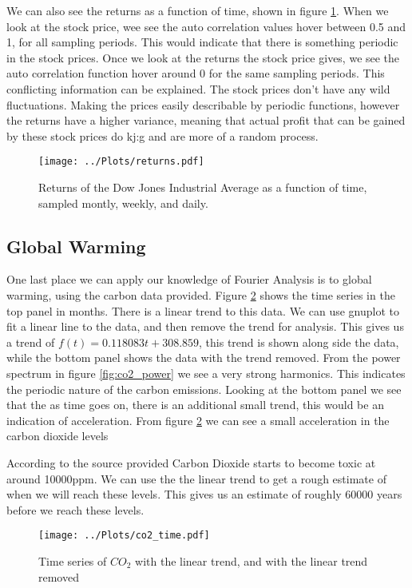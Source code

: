 \documentclass[twocolumn]{myarticle}
\begin{document}
We can also see the returns as a function of time, shown in figure \ref{fig:returns}. 
When we look at the stock price, wee see the auto correlation values hover between 0.5 and 1, for all sampling periods. 
This would indicate that there is something periodic in the stock prices. 
Once we look at the returns the stock price gives, we see the auto correlation function hover around 0 for the same sampling periods. 
This conflicting information can be explained. 
The stock prices don't have any wild fluctuations. 
Making the prices easily describable by periodic functions, however the returns have a higher variance, meaning that actual profit that can be gained by these stock prices do kj:g and are more of a random process. 

\begin{figure}[ht]
    \centering
    \texttt{[image: ../Plots/returns.pdf]}
    \caption{Returns of the Dow Jones Industrial Average as a function of time, sampled montly, weekly, and daily.}
    \label{fig:returns}
\end{figure}


\subsection{Global Warming}
One last place we can apply our knowledge of Fourier Analysis is to global warming, using the carbon data provided. 
Figure \ref{fig:co2_time} shows the time series in the top panel in months. 
There is a linear trend to this data. 
We can use gnuplot to fit a linear line to the data, and then remove the trend for analysis. 
This gives us a trend of $f(t) = 0.118083t + 308.859$, this trend is shown along side the data, while the bottom panel shows the data with the trend removed. 
From the power spectrum in figure \ref{fig:co2_power} we see a very strong harmonics. 
This indicates the periodic nature of the carbon emissions. 
Looking at the bottom panel we see that the as time goes on, there is an additional small trend, this would be an indication of acceleration. 
From figure \ref{fig:co2_time} we can see a small acceleration in the carbon dioxide levels

According to the source provided Carbon Dioxide starts to become toxic at around 10000ppm. 
We can use the the linear trend to get a rough estimate of when we will reach these levels. 
This gives us an estimate of roughly 60000 years before we reach these levels. 


\begin{figure}[ht]
    \centering
    \texttt{[image: ../Plots/co2\_time.pdf]}
    \caption{Time series of $CO_{2}$ with the linear trend, and with the linear trend removed}
    \label{fig:co2_time}
\end{figure}
\end{document}
